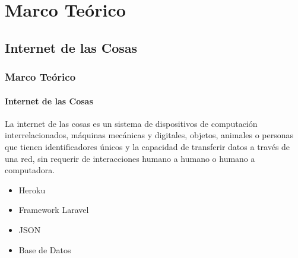 \section{Marco Teórico}

\begin{frame}
\subsection{Internet de las Cosas}
\frametitle{Marco Teórico}
\framesubtitle{Internet de las Cosas}

La internet de las cosas es un sistema de dispositivos de computación interrelacionados, máquinas mecánicas y digitales, objetos, animales o personas que tienen identificadores únicos y la capacidad de transferir datos a través de una red, sin requerir de interacciones humano a humano o humano a computadora. \newline

\begin{itemize}
	\item Heroku
	\item Framework Laravel
	\item JSON
	\item Base de Datos
\end{itemize}

\end{frame}

